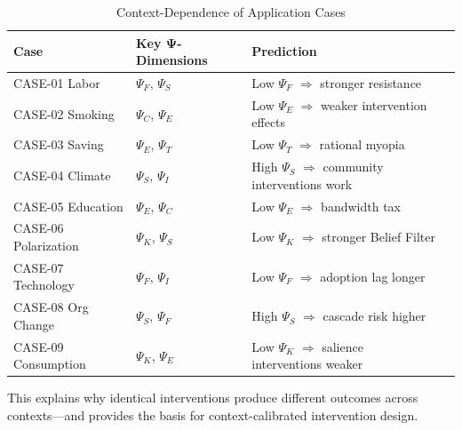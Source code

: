 \begin{table}[htbp]
\centering
\caption{Context-Dependence of Application Cases}
\label{tab:case-context}
\small
\begin{tabular}{@{}llll@{}}
\toprule
\textbf{Case} & \textbf{Key Ψ-Dimensions} & \textbf{Prediction} \\
\midrule
CASE-01 Labor & $\Psi_F$, $\Psi_S$ & Low $\Psi_F$ $\Rightarrow$ stronger resistance \\
CASE-02 Smoking & $\Psi_C$, $\Psi_E$ & Low $\Psi_E$ $\Rightarrow$ weaker intervention effects \\
CASE-03 Saving & $\Psi_E$, $\Psi_T$ & Low $\Psi_T$ $\Rightarrow$ rational myopia \\
CASE-04 Climate & $\Psi_S$, $\Psi_I$ & High $\Psi_S$ $\Rightarrow$ community interventions work \\
CASE-05 Education & $\Psi_E$, $\Psi_C$ & Low $\Psi_E$ $\Rightarrow$ bandwidth tax \\
CASE-06 Polarization & $\Psi_K$, $\Psi_S$ & Low $\Psi_K$ $\Rightarrow$ stronger Belief Filter \\
CASE-07 Technology & $\Psi_F$, $\Psi_I$ & Low $\Psi_F$ $\Rightarrow$ adoption lag longer \\
CASE-08 Org Change & $\Psi_S$, $\Psi_F$ & High $\Psi_S$ $\Rightarrow$ cascade risk higher \\
CASE-09 Consumption & $\Psi_K$, $\Psi_E$ & Low $\Psi_K$ $\Rightarrow$ salience interventions weaker \\
\bottomrule
\end{tabular}
\end{table}

This explains why identical interventions produce different outcomes across contexts---and provides the basis for context-calibrated intervention design.





